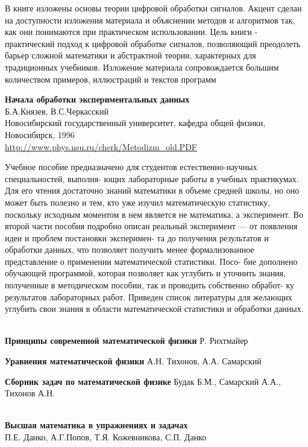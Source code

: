 \begin{thebibliography}{99}
В книге изложены основы теории цифровой обработки сигналов. Акцент сделан на
доступности изложения материала и объяснении методов и алгоритмов так, как они
понимаются при практическом использовании. Цель книги - практический подход к
цифровой обработке сигналов, позволяющий преодолеть барьер сложной математики и
абстрактной теории, характерных для традиционных учебников. Изложение материала
сопровождается большим количеством примеров, иллюстраций и текстов программ

\textbf{Начала обработки экспериментальных данных}\\
Б.А.Князев, В.С.Черкасский\\
Новосибирский государственный университет, кафедра общей физики,
Новосибирск, 1996\\
\url{http://www.phys.nsu.ru/cherk/Metodizm_old.PDF}

Учебное пособие предназначено для студентов естественно-научных специальностей,
выполня- ющих лабораторные работы в учебных практикумах. Для его чтения
достаточно знаний математики в объеме средней школы, но оно может быть полезно и
тем, кто уже изучил математическую статистику, поскольку исходным моментом в нем
является не математика, а эксперимент. Во второй части пособия подробно описан
реальный эксперимент — от появления идеи и проблем постановки эксперимен- та до
получения результатов и обработки данных, что позволяет получить менее
формализованное представление о применении математической статистики. Посо- бие
дополнено обучающей программой, которая позволяет как углубить и уточнить
знания, полученные в методическом пособии, так и проводить собственно обработ-
ку результатов лабораторных работ. Приведен список литературы для желающих
углубить свои знания в области математической статистики и обработки данных.

\ \\
\textbf{Принципы современной математической физики}
Р. Рихтмайер

\textbf{Уравнения математической физики}
А.Н. Тихонов, А.А. Самарский

\textbf{Сборник задач по математической физике}
Будак Б.М., Самарский А.А., Тихонов А.Н.

\ \\
\textbf{Высшая математика в упражнениях и задачах}\\
П.Е. Данко, А.Г.Попов, Т.Я. Кожевникова, С.П. Данко


\end{thebibliography}
